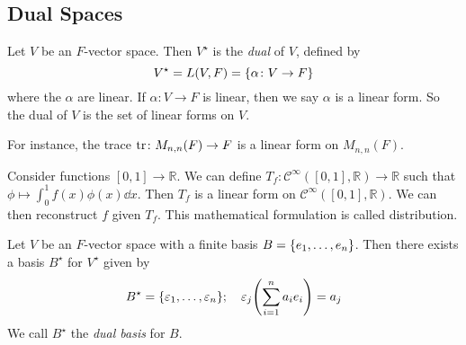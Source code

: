 \subsection{Dual Spaces}
\begin{definition}
	Let \( V \) be an \( F \)-vector space.
	Then \( V^\star \) is the \textit{dual} of \( V \), defined by
	\[ V^\star = L(V,F) = \qty{\alpha \colon V \to F} \]
	where the \( \alpha \) are linear.
	If \( \alpha \colon V \to F \) is linear, then we say \( \alpha \) is a linear form.
	So the dual of \( V \) is the set of linear forms on \( V \).
\end{definition}
\begin{example}
	For instance, the trace \( \tr \colon M_{n,n}(F) \to F \) is a linear form on \( M_{n,n}(F) \).
\end{example}
\begin{example}
	Consider functions \( [0,1] \to \mathbb R \).
	We can define \( T_f \colon \mathcal C^\infty([0,1], \mathbb R) \to \mathbb R \) such that \( \phi \mapsto \int_0^1 f(x) \phi(x) \dd{x} \).
	Then \( T_f \) is a linear form on \( \mathcal C^{\infty}([0,1], \mathbb R) \).
	We can then reconstruct \( f \) given \( T_f \).
	This mathematical formulation is called distribution.
\end{example}
\begin{lemma}
	Let \( V \) be an \( F \)-vector space with a finite basis \( B = \qty{e_1, \dots, e_n} \).
	Then there exists a basis \( B^\star \) for \( V^\star \) given by
	\[ B^\star = \qty{\varepsilon_1, \dots, \varepsilon_n}; \quad \varepsilon_j \qty( \sum_{i=1}^n a_i e_i ) = a_j \]
	We call \( B^\star \) the \textit{dual basis} for \( B \).
\end{lemma}
